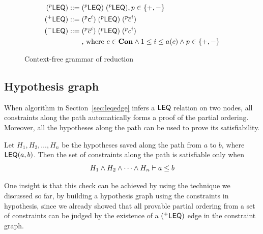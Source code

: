 \begin{figure}
\hfil
\begin{minipage}{2.3in}
\begin{align*}
(^{p}\mathsf{LEQ}) ::=\; & (^{p}\mathsf{LEQ})\; (^{p}\mathsf{LEQ}), p\in \{+,-\} \\
(^{+}\mathsf{LEQ}) ::=\; & (^{p}\textsf{c}^{i})\; (^{p}\mathsf{LEQ})\;
(^{p}\overline{c}^{i}) \\
(^{-}\mathsf{LEQ}) ::=\; & (^{p}\overline{c}^{i})\;
(^{p}\mathsf{LEQ})\; (^{p}c^{i}) \\
     & \text{, where } c\in \mathbf{Con} \land 1 \leq i\leq a(c) \land p\in \{+,-\}\\
\end{align*}
\end{minipage}
\caption{Context-free grammar of reduction}
\label{figure:cfg}
\end{figure}

% 
\subsection{Hypothesis graph}
\label{sec:hypograph}

When algorithm in Section~\ref{sec:leqedge} infers a $\mathsf{LEQ}$ relation
on two nodes, all constraints along the path automatically forms a
proof of the partial ordering. Moreover, all the hypotheses along the
path can be used to prove its satisfiability.

Let $H_1, H_2, \dots, H_n$ be the hypotheses saved along the path from $a$ to
$b$, where $\mathsf{LEQ}(a,b)$. Then the set of constraints along the path is
satisfiable only when
\[H_1 \land H_2 \land \dots \land H_n \vdash a \leq b\]

One insight is that this check can be achieved by using the technique
we discussed so far, by building a hypothesis graph using the
constraints in hypothesis, since we already showed that all provable
partial ordering from a set of constraints can be judged by the
existence of a $(^{+}\mathsf{LEQ})$ edge in the constraint graph.


